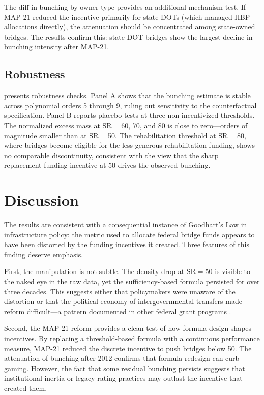 \documentclass[12pt]{article}
\begin{document}
The diff-in-bunching by owner type provides an additional mechanism test. If MAP-21 reduced the incentive primarily for state DOTs (which managed HBP allocations directly), the attenuation should be concentrated among state-owned bridges. The results confirm this: state DOT bridges show the largest decline in bunching intensity after MAP-21.

\subsection{Robustness}



 presents robustness checks. Panel A shows that the bunching estimate is stable across polynomial orders 5 through 9, ruling out sensitivity to the counterfactual specification. Panel B reports placebo tests at three non-incentivized thresholds. The normalized excess mass at SR$=$60, 70, and 80 is close to zero---orders of magnitude smaller than at SR$=$50. The rehabilitation threshold at SR$=$80, where bridges become eligible for the less-generous rehabilitation funding, shows no comparable discontinuity, consistent with the view that the sharp replacement-funding incentive at 50 drives the observed bunching.


\section{Discussion}

The results are consistent with a consequential instance of Goodhart's Law in infrastructure policy: the metric used to allocate federal bridge funds appears to have been distorted by the funding incentives it created. Three features of this finding deserve emphasis.

First, the manipulation is not subtle. The density drop at SR$=$50 is visible to the naked eye in the raw data, yet the sufficiency-based formula persisted for over three decades. This suggests either that policymakers were unaware of the distortion or that the political economy of intergovernmental transfers made reform difficult---a pattern documented in other federal grant programs \citep{fisman2017corruption, baicker2005spillover}.

Second, the MAP-21 reform provides a clean test of how formula design shapes incentives. By replacing a threshold-based formula with a continuous performance measure, MAP-21 reduced the discrete incentive to push bridges below 50. The attenuation of bunching after 2012 confirms that formula redesign can curb gaming. However, the fact that some residual bunching persists suggests that institutional inertia or legacy rating practices may outlast the incentive that created them.
\end{document}
